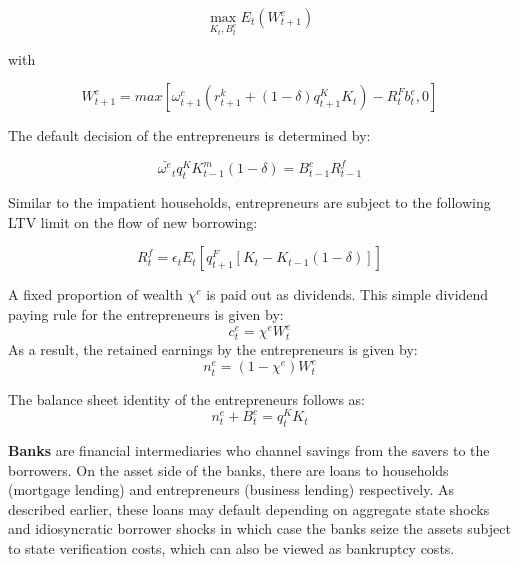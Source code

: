 \documentclass[12pt]{article}
\numberwithin{equation}{section}
\begin{document}
\begin{equation}
\max_{K_t,B^e_t}E_t(W^e_{t+1})
\end{equation}	

with

\begin{equation}
W^e_{t+1}=max[\omega^e_{t+1}(r^k_{t+1}+(1-\delta)q^K_{t+1}K_{t})-R^F_{t}b^e_{t},0]
\end{equation}


The default decision of the entrepreneurs is determined by: 

\begin{equation}
\bar{\omega^e}_t q^K_{t} K^m_{t-1}(1-\delta) = B^e_{t-1}R^f_{t-1}
\end{equation}

Similar to the impatient households, entrepreneurs are subject to the following LTV limit on the flow of new borrowing: 

\begin{equation}
[B^e_t-B^e_{t-1}(1-rp)]R^f_{t} =\epsilon_{t} E_t[q^F_{t+1} [K_t-K_{t-1}(1-\delta)]]
\end{equation}


A fixed proportion of wealth $\chi^e$ is paid out as dividends. This simple dividend paying rule for the entrepreneurs is given by:
\begin{equation}
c^e_t=\chi^e W^e_t
\end{equation}
As a result, the retained earnings by the entrepreneurs is given by:
\begin{equation}
n^e_t=(1-\chi^e) W^e_t
\end{equation}

The balance sheet identity of the entrepreneurs follows as:
\begin{equation}
n^e_t+B^e_t=q^K_t K_t
\end{equation}

\noindent
\textbf{Banks } are financial intermediaries who channel savings from the savers to the borrowers. On the asset side of the banks, there are loans to households (mortgage lending) and entrepreneurs (business lending) respectively. As described earlier, these loans may default depending on aggregate state shocks and idiosyncratic borrower shocks in which case the banks seize the assets subject to state verification costs, which can also be viewed as bankruptcy costs. 
\end{document}
